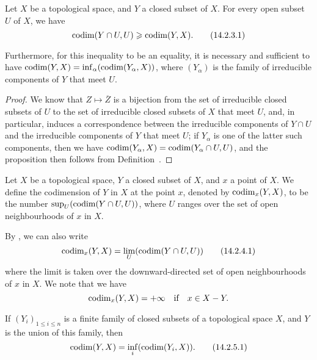 \begin{prop}[14.2.3]
\label{0.14.2.3}
Let $X$ be a topological space, and $Y$ a closed subset of $X$.
For every open subset $U$ of $X$, we have
\begin{equation*}
\label{0.14.2.3.1}
    {\mathop{\mathrm{codim}}\nolimits}(Y\cap U,U) \geqslant {\mathop{\mathrm{codim}}\nolimits}(Y,X).\tag{14.2.3.1}
\end{equation*}

Furthermore, for this inequality  to be an equality, it is necessary and sufficient to have ${\mathop{\mathrm{codim}}\nolimits}(Y,X)=\inf_\alpha({\mathop{\mathrm{codim}}\nolimits}(Y_\alpha,X))$, where $(Y_\alpha)$ is the family of irreducible components of $Y$ that meet $U$.
\end{prop}

\begin{proof}
\label{proof-0.14.2.3}
We know  that $Z\mapsto\overline{Z}$ is a bijection from the set of irreducible closed subsets of $U$ to the set of irreducible closed subsets of $X$ that meet $U$, and, in particular, induces a correspondence between the irreducible components of $Y\cap U$ and the irreducible components of $Y$ that meet $U$;
if $Y_\alpha$ is one of the latter such components, then we have ${\mathop{\mathrm{codim}}\nolimits}(Y_\alpha,X)={\mathop{\mathrm{codim}}\nolimits}(Y_\alpha\cap U,U)$, and the proposition then follows from Definition~.
\end{proof}

\begin{defn}[14.2.4]
\label{0.14.2.4}
Let $X$ be a topological space, $Y$ a closed subset of $X$, and $x$ a point of $X$.
We define the codimension of $Y$ in $X$ at the point $x$, denoted by ${\mathop{\mathrm{codim}}\nolimits}_x(Y,X)$, to be the number $\sup_U({\mathop{\mathrm{codim}}\nolimits}(Y\cap U,U))$, where $U$ ranges over the set of open neighbourhoods of $x$ in $X$.
\end{defn}

By , we can also write
\begin{equation*}
\label{0.14.2.4.1}
    {\mathop{\mathrm{codim}}\nolimits}_x(Y,X) = \lim_U({\mathop{\mathrm{codim}}\nolimits}(Y\cap U, U))\tag{14.2.4.1}
\end{equation*}
where the limit is taken over the downward-directed set of open neighbourhoods of $x$ in $X$.
We note that we have
\[
    {\mathop{\mathrm{codim}}\nolimits}_x(Y,X) = +\infty \quad\text{if}\quad x\in X- Y.
\]

\begin{prop}[14.2.5]
\label{0.14.2.5}
If $(Y_i)_{1\leq i\leq n}$ is a finite family of closed subsets of a topological space $X$, and $Y$ is the union of this family, then
\begin{equation*}
\label{0.14.2.5.1}
    {\mathop{\mathrm{codim}}\nolimits}(Y,X) = \inf_i({\mathop{\mathrm{codim}}\nolimits}(Y_i,X)).\tag{14.2.5.1}
\end{equation*}
\end{prop}

